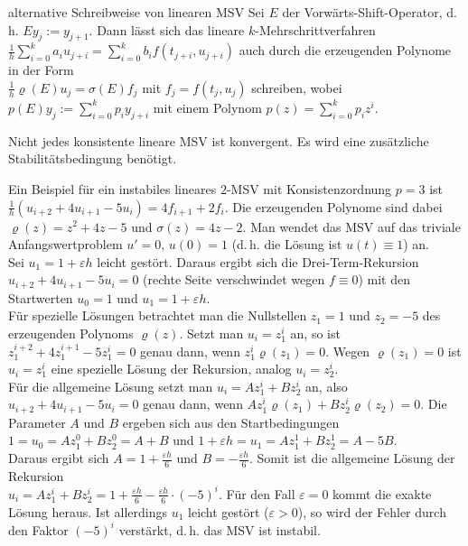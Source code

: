 \begin{Def}{alternative Schreibweise von linearen MSV}
    Sei $E$ der Vorwärts-Shift-Operator, d.\,h. $E y_j := y_{j+1}$.
    Dann lässt sich das lineare $k$-Mehrschrittverfahren\\
    $\frac{1}{h} \sum_{i=0}^k a_i u_{j+i} =
    \sum_{i=0}^k b_i f(t_{j+i}, u_{j+i})$
    auch durch die erzeugenden Polynome in der Form\\
    $\frac{1}{h} \varrho(E) u_j = \sigma(E) f_j$
    mit $f_j = f(t_j, u_j)$ schreiben, wobei
    $p(E) y_j := \sum_{i=0}^k p_i y_{j+i}$ mit einem Polynom
    $p(z) = \sum_{i=0}^k p_i z^i$.
\end{Def}

\linie

\begin{Bem}
    Nicht jedes konsistente lineare MSV ist konvergent.
    Es wird eine zusätzliche Stabilitätsbedingung benötigt.
\end{Bem}

\begin{Bsp}
    Ein Beispiel für ein instabiles lineares $2$-MSV mit
    Konsistenzordnung $p = 3$ ist\\
    $\frac{1}{h} (u_{i+2} + 4 u_{i+1} - 5 u_i) = 4 f_{i+1} + 2 f_i$.
    Die erzeugenden Polynome sind dabei
    $\varrho(z) = z^2 + 4z - 5$ und $\sigma(z) = 4z - 2$.
    Man wendet das MSV auf das triviale Anfangswertproblem
    $u' = 0$, $u(0) = 1$ (d.\,h. die Lösung ist $u(t) \equiv 1$) an.\\
    Sei $u_1 = 1 + \varepsilon h$ leicht gestört.
    Daraus ergibt sich die Drei-Term-Rekursion
    $u_{i+2} + 4 u_{i+1} - 5 u_i = 0$
    (rechte Seite verschwindet wegen $f \equiv 0$)
    mit den Startwerten $u_0 = 1$ und $u_1 = 1 + \varepsilon h$.\\
    Für spezielle Lösungen betrachtet man die Nullstellen
    $z_1 = 1$ und $z_2 = -5$ des erzeugenden Polynoms $\varrho(z)$.
    Setzt man $u_i = z_1^i$ an, so ist
    $z_1^{i+2} + 4 z_1^{i+1} - 5 z_1^i = 0$ genau dann, wenn
    $z_1^i \varrho(z_1) = 0$.
    Wegen $\varrho(z_1) = 0$ ist
    $u_i = z_1^i$ eine spezielle Lösung der Rekursion,
    analog $u_i = z_2^i$.\\
    Für die allgemeine Lösung setzt man $u_i = A z_1^i + B z_2^i$ an, also
    $u_{i+2} + 4 u_{i+1} - 5 u_i = 0$ genau dann, wenn
    $A z_1^i \varrho(z_1) + B z_2^i \varrho(z_2) = 0$.
    Die Parameter $A$ und $B$ ergeben sich aus den Startbedingungen
    $1 = u_0 = A z_1^0 + B z_2^0 = A + B$ und
    $1 + \varepsilon h = u_1 = A z_1^1 + B z_2^1 = A - 5B$.\\
    Daraus ergibt sich $A = 1 + \frac{\varepsilon h}{6}$ und
    $B = -\frac{\varepsilon h}{6}$.
    Somit ist die allgemeine Lösung der Rekursion\\
    $u_i = A z_1^i + B z_2^i =
    1 + \frac{\varepsilon h}{6} - \frac{\varepsilon h}{6} \cdot (-5)^i$.
    Für den Fall $\varepsilon = 0$ kommt die exakte Lösung heraus.
    Ist allerdings $u_1$ leicht gestört ($\varepsilon > 0$), so wird der
    Fehler durch den Faktor $(-5)^i$ verstärkt, d.\,h. das MSV ist instabil.
\end{Bsp}

